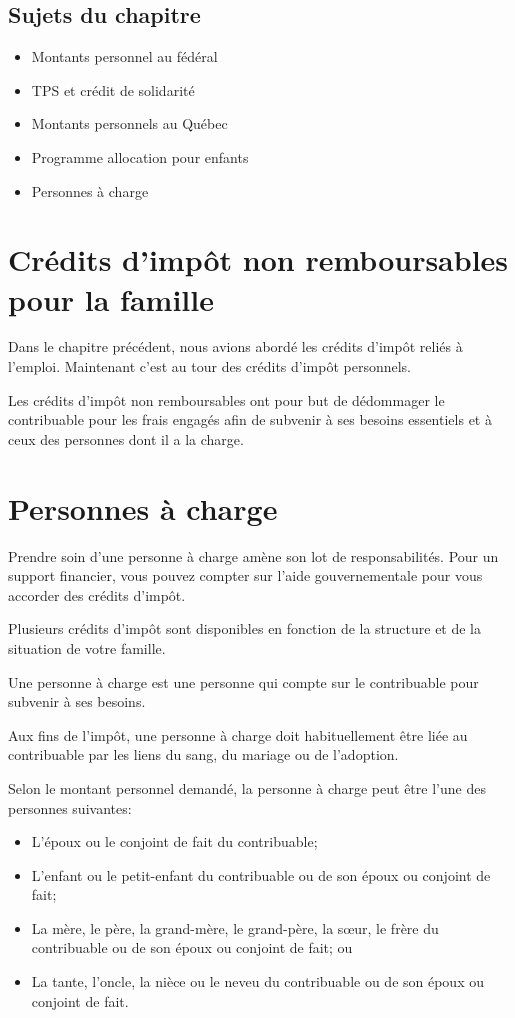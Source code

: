 \subsection{Sujets du chapitre}
\begin{itemize}
	\item Montants personnel au fédéral
	\item TPS et crédit de solidarité
	\item Montants personnels au Québec
	\item Programme allocation pour enfants
	\item Personnes à charge
\end{itemize}



\section{Crédits d'impôt non remboursables pour la famille}
\begin{intro}
	Dans le chapitre précédent, nous avions abordé les crédits d'impôt reliés à l'emploi. Maintenant c'est au tour des crédits d'impôt personnels. 
\end{intro}
Les crédits d'impôt non remboursables ont pour but de dédommager le contribuable pour les frais engagés afin de subvenir à ses besoins essentiels et à ceux des personnes dont il a la charge.



\section{Personnes à charge}
\begin{intro}
	Prendre soin d'une personne à charge amène son lot de responsabilités. Pour un support financier, vous pouvez compter sur l'aide gouvernementale pour vous accorder des crédits d'impôt.
	
	Plusieurs crédits d'impôt sont disponibles en fonction de la structure et de la situation de votre famille.
\end{intro}

Une \og personne à charge \fg{} est une personne qui compte sur le contribuable pour subvenir à ses besoins.

Aux fins de l'impôt, une personne à charge doit habituellement être liée au contribuable par les liens du sang, du mariage ou de l'adoption. 

Selon le montant personnel demandé, la personne à charge peut être l'une des personnes suivantes:
\begin{itemize}
	\item L'époux ou le conjoint de fait du contribuable;
	\item L'enfant ou le petit-enfant du contribuable ou de son époux ou conjoint de fait;
	\item La mère, le père, la grand-mère, le grand-père, la sœur, le frère du contribuable ou de son époux ou conjoint de fait; ou
	\item La tante, l'oncle, la nièce ou le neveu du contribuable ou de son époux ou conjoint de fait.
\end{itemize}

